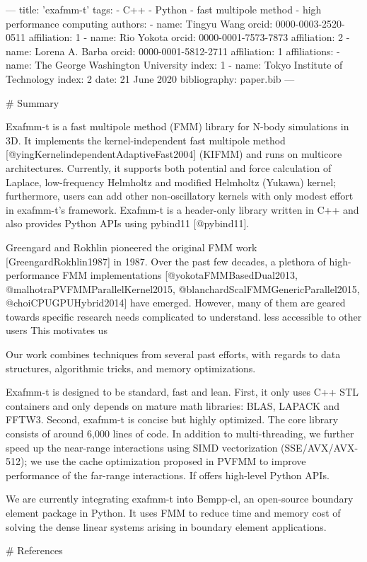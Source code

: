 ---
title: 'exafmm-t'
tags:
  - C++
  - Python
  - fast multipole method
  - high performance computing
authors:
 - name: Tingyu Wang
   orcid: 0000-0003-2520-0511
   affiliation: 1
 - name: Rio Yokota
   orcid: 0000-0001-7573-7873
   affiliation: 2
 - name: Lorena A. Barba
   orcid: 0000-0001-5812-2711
   affiliation: 1
affiliations:
 - name: The George Washington University
   index: 1
 - name: Tokyo Institute of Technology
   index: 2
date: 21 June 2020
bibliography: paper.bib
---

# Summary

Exafmm-t is a fast multipole method (FMM) library for N-body simulations in 3D.
It implements the kernel-independent fast multipole method [@yingKernelindependentAdaptiveFast2004] (KIFMM) and runs on multicore architectures. 
Currently, it supports both potential and force calculation of Laplace, low-frequency Helmholtz and modified Helmholtz (Yukawa) kernel; furthermore, users can add other non-oscillatory kernels with only modest effort in exafmm-t's framework.
Exafmm-t is a header-only library written in C++ and also provides Python APIs using pybind11 [@pybind11].

Greengard and Rokhlin pioneered the original FMM work [GreengardRokhlin1987] in 1987.
Over the past few decades, a plethora of high-performance FMM implementations [@yokotaFMMBasedDual2013, @malhotraPVFMMParallelKernel2015, @blanchardScalFMMGenericParallel2015, @choiCPUGPUHybrid2014] have emerged.
However, many of them are geared towards specific research needs complicated to understand.
less accessible to other users
This motivates us 

Our work combines techniques from several past efforts, with regards to data structures, algorithmic tricks, and memory optimizations.

Exafmm-t is designed to be standard, fast and lean.
First, it only uses C++ STL containers and only depends on mature math libraries: BLAS, LAPACK and FFTW3.
Second, exafmm-t is concise but highly optimized. The core library consists of around 6,000 lines of code.
In addition to multi-threading, we further speed up the near-range interactions using SIMD vectorization (SSE/AVX/AVX-512); we use the cache optimization proposed in PVFMM to improve performance of the far-range interactions.
If offers high-level Python APIs.

We are currently integrating exafmm-t into Bempp-cl, an open-source boundary element package in Python.
It uses FMM to reduce time and memory cost of solving the dense linear systems arising in boundary element applications.

# References

